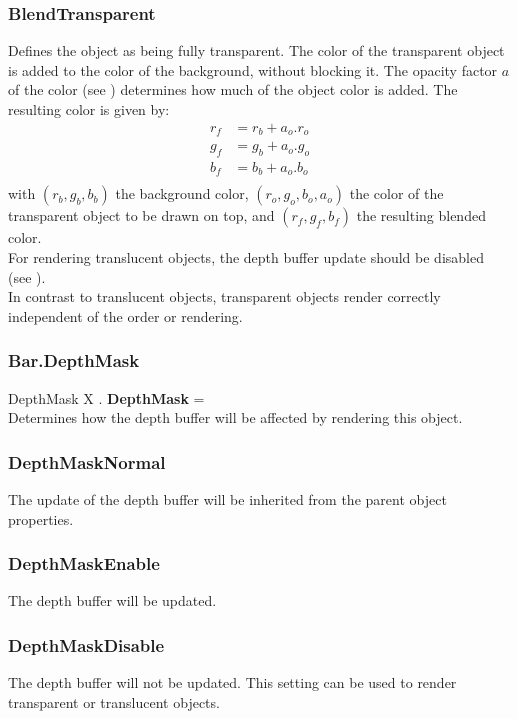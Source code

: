 \subsubsection{BlendTransparent \label{T:BlendType|BlendTransparent}}
Defines the object as being fully transparent. The color of the transparent object is added to the color of the background, without blocking it. The opacity factor $a$ of the color (see ) determines how much of the object color is added. The resulting color is given by:
\begin{equation}
\begin{array}{rcl}
r_f & = r_b + a_o . r_o \\
g_f & = g_b + a_o . g_o \\
b_f & = b_b + a_o . b_o \\
\end{array}
\end{equation}
with $(r_b,g_b,b_b)$ the background color, $(r_o,g_o,b_o,a_o)$ the color of the transparent object to be drawn on top, and $(r_f,g_f,b_f)$ the resulting blended color. \\
For rendering translucent objects, the depth buffer update should be disabled (see ). \\
In contrast to translucent objects, transparent objects render correctly independent of the order or rendering.

\subsubsection{Bar.DepthMask \label{F:Bar:DepthMask}}
DepthMask X . \textbf{DepthMask} = \\
Determines how the depth buffer will be affected by rendering this object.

\subsubsection{DepthMaskNormal \label{T:DepthMask|DepthMaskNormal}}
The update of the depth buffer will be inherited from the parent object properties.

\subsubsection{DepthMaskEnable \label{T:DepthMask|DepthMaskEnable}}
The depth buffer will be updated.

\subsubsection{DepthMaskDisable \label{T:DepthMask|DepthMaskDisable}}
The depth buffer will not be updated. This setting can be used to render transparent or translucent objects.


